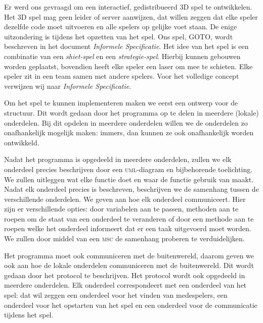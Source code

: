 Er werd ons gevraagd om een interactief, gedistribueerd 3D spel te ontwikkelen. Het 3D spel mag geen leider of server aanwijzen, dat willen zeggen dat elke speler dezelfde code moet uitvoeren en alle spelers op gelijke voet staan. De enige uitzondering is tijdens het opzetten van het spel. Ons spel, \textsc{GOTO}, wordt beschreven in het document \emph{Informele Specificatie}. Het idee van het spel is een combinatie van een \emph{shiet-spel} en een \emph{strategie-spel}. Hierbij kunnen gebouwen worden geplaatst, bovendien heeft elke speler een laser om mee te schieten. Elke speler zit in een team samen met andere spelers. Voor het volledige concept verwijzen wij naar \emph{Informele Specificatie}.

Om het spel te kunnen implementeren maken we eerst een ontwerp voor de structuur. Dit wordt gedaan door het programma op te delen in meerdere (lokale) onderdelen. Bij dit opdelen in meerdere onderdelen willen we de onderdelen zo onafhankelijk mogelijk maken: immers, dan kunnen ze ook onafhankelijk worden ontwikkeld.

Nadat het programma is opgedeeld in meerdere onderdelen, zullen we elk onderdeel precies beschrijven door een \textsc{uml}-diagram en bijbehorende toelichting. We zullen uitleggen wat elke functie doet en waar de functie gebruik van maakt. Nadat elk onderdeel precies is beschreven, beschrijven we de samenhang tussen de verschillende onderdelen. We geven aan hoe elk onderdeel communiceert. Hier zijn er verschillende opties: door variabelen aan te passen, methoden aan te roepen om de staat van een onderdeel te veranderen of door een methode aan te roepen welke het onderdeel informeert dat er een taak uitgevoerd moet worden. We zullen door middel van een \textsc{msc} de samenhang proberen te verduidelijken.

Het programma moet ook communiceren met de buitenwereld, daarom geven we ook aan hoe de lokale onderdelen communiceren met de buitenwereld. Dit wordt gedaan door het protocol te beschrijven. Het protocol wordt ook opgedeeld in meerdere onderdelen. Elk onderdeel correspondeert met een onderdeel van het spel: dat wil zeggen een onderdeel voor het vinden van medespelers, een onderdeel voor het opstarten van het spel en een onderdeel voor de communicatie tijdens het spel.
